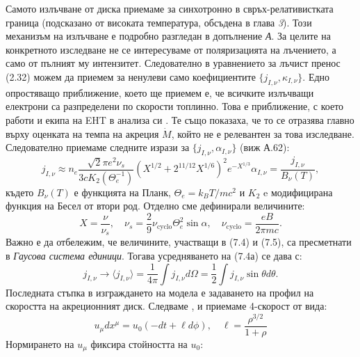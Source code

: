 Самото излъчване от диска приемаме за синхотронно в свръх-релативистката граница (подсказано от високата температура, обсъдена в глава \emph{3}). Този механизъм на излъчване е подробно разгледан в допълнение \emph{А}. За целите на конкретното изследване не се интересуваме от поляризацията на лъчението, а само от пълният му интензитет. Следователно в уравнението за лъчист пренос (2.32) можем да приемем за ненулеви само коефициентите $\{j_{I,\nu}, \kappa_{I,\nu}\}.$ Едно опростяващо приближение, което ще приемем е, че всичките излъчващи електрони са разпределени по скорости топлинно. Това е приближение, с което работи и екипа на EHT в анализа си \cite{EHT_M87_VIII}. Те също показаха, че то се отразява главно върху оценката на темпа на акреция $\dot{M}$, който не е релевантен за това изследване. Следователно приемаме следните изрази за $\{j_{I,\nu}, \alpha_{I,\nu}\}$ (виж А.62):
\begin{subequations}
	\begin{equation}
		j_{I,\nu}\approx n_e \frac{\sqrt{2}\pi e^2\nu_s}{3cK_2(\Theta_e^{-1})}\left(X^{1/2} + 2^{11/12}X^{1/6}\right)^2 e^{-X^{1/3}}
	\end{equation}
	\begin{equation}
		\alpha_{I,\nu} = \frac{j_{I,\nu}}{B_\nu(T)},
	\end{equation}
\end{subequations}
където $B_\nu(T)$ е функцията на Планк, $\Theta_e = k_BT/mc^2$ и $K_2$ e модифицирана функция на Бесел от втори род. Отделно сме дефинирали величините:
\begin{equation}
	X = \frac{\nu}{\nu_s},\quad \nu_s = \frac{2}{9}\nu_\text{cyclo}\Theta_e^2\sin\alpha, \quad \nu_\text{cyclo} = \frac{eB}{2\pi m c}.
\end{equation}
Важно е да отбележим, че величините, участващи в (7.4) и (7.5), са пресметнати в \emph{Гаусова система единици}. Тогава усредняването на (7.4а) се дава с:
\begin{equation}
	j_{I,\nu}\rightarrow\langle j_{I,\nu} \rangle = \frac{1}{4\pi}\int j_{I,\nu} d\Omega = \frac{1}{2}\int j_{I,\nu} \sin\theta d\theta.
\end{equation}
Последната стъпка в изграждането на модела е задаването на профил на скоростта на акреционният диск. Следваме \cite{Broderick2021}, \cite{Gold2020} и приемаме 4-скорост от вида:
\begin{equation}
	u_\mu dx^\mu = u_0(-dt + \ell d\phi),\quad \ell = \frac{\rho^{3/2}}{1 +\rho}
\end{equation}
Нормирането на $u_\mu$ фиксира стойността на $u_0$:
